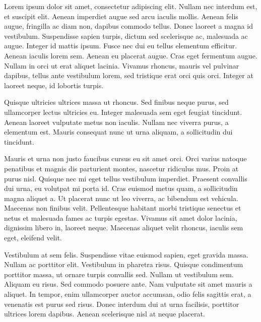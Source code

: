 \documentclass[17pt]{extarticle}
\begin{document}

Lorem ipsum dolor sit amet, consectetur adipiscing elit. Nullam nec interdum est, et suscipit elit. Aenean imperdiet augue sed arcu iaculis mollis. Aenean felis augue, fringilla ac diam non, dapibus commodo tellus. Donec laoreet a magna id vestibulum. Suspendisse sapien turpis, dictum sed scelerisque ac, malesuada ac augue. Integer id mattis ipsum. Fusce nec dui eu tellus elementum efficitur. Aenean iaculis lorem sem. Aenean eu placerat augue. Cras eget fermentum augue. Nullam in orci ut erat aliquet lacinia. Vivamus rhoncus, mauris vel pulvinar dapibus, tellus ante vestibulum lorem, sed tristique erat orci quis orci. Integer at laoreet neque, id lobortis turpis.

Quisque ultricies ultrices massa ut rhoncus. Sed finibus neque purus, sed ullamcorper lectus ultricies eu. Integer malesuada sem eget feugiat tincidunt. Aenean laoreet vulputate metus non iaculis. Nullam nec viverra purus, a elementum est. Mauris consequat nunc ut urna aliquam, a sollicitudin dui tincidunt.

Mauris et urna non justo faucibus cursus eu sit amet orci. Orci varius natoque penatibus et magnis dis parturient montes, nascetur ridiculus mus. Proin at purus nisl. Quisque nec mi eget tellus vestibulum imperdiet. Praesent convallis dui urna, eu volutpat mi porta id. Cras euismod metus quam, a sollicitudin magna aliquet a. Ut placerat nunc ut leo viverra, ac bibendum est vehicula. Maecenas non finibus velit. Pellentesque habitant morbi tristique senectus et netus et malesuada fames ac turpis egestas. Vivamus sit amet dolor lacinia, dignissim libero in, laoreet neque. Maecenas aliquet velit rhoncus, iaculis sem eget, eleifend velit.

\color{mygreen}Vestibulum at sem felis. Suspendisse vitae euismod sapien, eget gravida massa. Nullam ac porttitor elit. Vestibulum in pharetra risus. Quisque condimentum porttitor massa, ut ornare turpis convallis sed. Nullam ut vestibulum sem. Aliquam eu risus. Sed commodo posuere ante. Nam vulputate sit amet mauris a aliquet. In tempor, enim ullamcorper auctor accumsan, odio felis sagittis erat, a venenatis est purus sed risus. Donec interdum dui at urna facilisis, porttitor ultrices lorem dapibus. Aenean scelerisque nisl at neque placerat.
\end{document}
